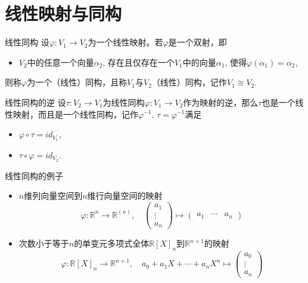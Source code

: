 
\section{线性映射与同构}


\begin{frame}

\begin{block}{线性同构}
设$\varphi: V_1 \to V_2$为一个线性映射。若$\varphi$是一个双射，即
\begin{itemize}
\item $V_2$中的任意一个向量$\alpha_2$, 存在且仅存在一个$V_1$中的向量$\alpha_1$, 使得$\varphi(\alpha_1) = \alpha_2$,
\end{itemize}
则称$\varphi$为一个（线性）同构，且称$V_1$与$V_2$（线性）同构，记作$V_1 \cong V_2$.
\end{block}

\vspace{1em}
\pause

\begin{block}{线性同构的逆}
设$\tau: V_2 \to V_1$为线性同构$\varphi: V_1 \to V_2$作为映射的逆，那么$\tau$也是一个线性映射，而且是一个线性同构，记作$\varphi^{-1}$. $\tau = \varphi^{-1}$满足
\begin{itemize}
\item $\varphi\circ\tau = id_{V_1}$,
\item $\tau\circ\varphi = id_{V_2}$.
\end{itemize}
\end{block}

\end{frame}


\begin{frame}

\begin{block}{线性同构的例子}
\begin{itemize}
\item $n$维列向量空间到$n$维行向量空间的映射
$$\varphi: \mathbb{R}^n \to \mathbb{R}^{(n)}, \quad \begin{pmatrix} a_1 \\ \vdots \\ a_n \end{pmatrix} \mapsto \begin{pmatrix} a_1 & \cdots & a_n \end{pmatrix}$$
\item 次数小于等于$n$的单变元多项式全体$\mathbb{R}[X]_n$到$\mathbb{R}^{n+1}$的映射
$$\varphi: \mathbb{R}[X]_n \to \mathbb{R}^{n+1}, \quad a_0 + a_1X + \cdots + a_nX^n \mapsto \begin{pmatrix} a_0 \\ \vdots \\ a_n \end{pmatrix}$$
\end{itemize}
\end{block}

\end{frame}


